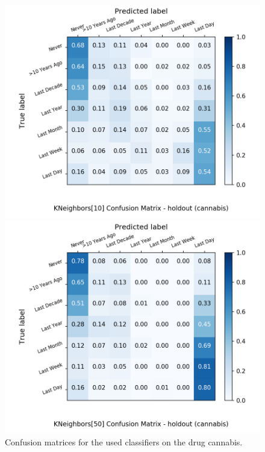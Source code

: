 \begin{figure}[H]
\begin{minipage}[b]{0.32\textwidth}
		\includegraphics[width=1.1\textwidth]{Plots/drugs/cannabis_KNeighbors_10_balance_False_holdout.png}
  \end{minipage}
	\begin{minipage}[b]{0.32\textwidth}
		\includegraphics[width=1.1\textwidth]{Plots/drugs/cannabis_KNeighbors_50_balance_False_holdout.png}
  \end{minipage}
	\caption{Confusion matrices for the used classifiers on the drug cannabis.}
\end{figure}

